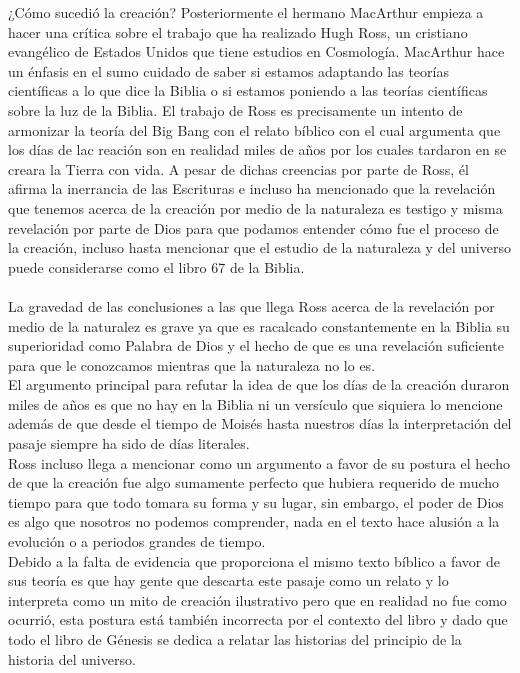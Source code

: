 \begin{section}{¿Cómo sucedió la creación?}
Posteriormente el hermano MacArthur empieza a hacer una crítica sobre el trabajo que ha realizado Hugh Ross, un cristiano evangélico de Estados Unidos que tiene estudios en Cosmología. MacArthur hace un énfasis en el sumo cuidado de saber si estamos adaptando las teorías científicas a lo que dice la Biblia o si estamos poniendo a las teorías científicas sobre la luz de la Biblia. El trabajo de Ross es precisamente un intento de armonizar la teoría del Big Bang con el relato bíblico con el cual argumenta que los días de lac reación son en realidad miles de años por los cuales tardaron en se creara la Tierra con vida.
\newpage
A pesar de dichas creencias por parte de Ross, él afirma la inerrancia de las Escrituras e incluso ha mencionado que la revelación que tenemos acerca de la creación por medio de la naturaleza es testigo y misma revelación por parte de Dios para que podamos entender cómo fue el proceso de la creación, incluso hasta mencionar que el estudio de la naturaleza y del universo puede considerarse como el libro 67 de la Biblia.\\ 
\\
La gravedad de las conclusiones a las que llega Ross acerca de la revelación por medio de la naturalez es grave ya que es racalcado constantemente en la Biblia su superioridad como Palabra de Dios y el hecho de que es una revelación suficiente para que le conozcamos mientras que la naturaleza no lo es.\\
El argumento principal para refutar la idea de que los días de la creación duraron miles de años es que no hay en la Biblia ni un versículo que siquiera lo mencione además de que desde el tiempo de Moisés hasta nuestros días la interpretación del pasaje siempre ha sido de días literales.\\
Ross incluso llega a mencionar como un argumento a favor de su postura el hecho de que la creación fue algo sumamente perfecto que hubiera requerido de mucho tiempo para que todo tomara su forma y su lugar, sin embargo, el poder de Dios es algo que nosotros no podemos comprender, nada en el texto hace alusión a la evolución o a periodos grandes de tiempo.\\
Debido a la falta de evidencia que proporciona el mismo texto bíblico a favor de sus teoría es que hay gente que descarta este pasaje como un relato y lo interpreta como un mito de creación ilustrativo pero que en realidad no fue como ocurrió, esta postura está también incorrecta por el contexto del libro y dado que todo el libro de Génesis se dedica a relatar las historias del principio de la historia del universo.\\

\end{section}
